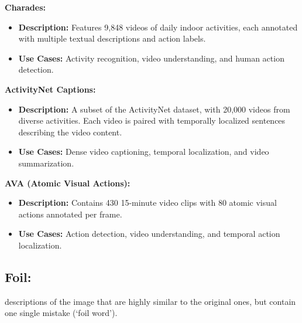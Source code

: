 \textbf{Charades:}
\begin{itemize}
\item \textbf{Description:} Features 9,848 videos of daily indoor activities, each annotated with multiple textual descriptions and action labels.
\item \textbf{Use Cases:} Activity recognition, video understanding, and human action detection.
\end{itemize}

\textbf{ActivityNet Captions:}
\begin{itemize}
\item \textbf{Description:} A subset of the ActivityNet dataset, with 20,000 videos from diverse activities. Each video is paired with temporally localized sentences describing the video content.
\item \textbf{Use Cases:} Dense video captioning, temporal localization, and video summarization.
\end{itemize}

\textbf{AVA (Atomic Visual Actions):}
\begin{itemize}
\item \textbf{Description:} Contains 430 15-minute video clips with 80 atomic visual actions annotated per frame.
\item \textbf{Use Cases:} Action detection, video understanding, and temporal action localization.
\end{itemize}
\subsection{Foil:}
\noindent descriptions of the image that are highly similar to the original ones, but contain one single mistake (‘foil word’).
